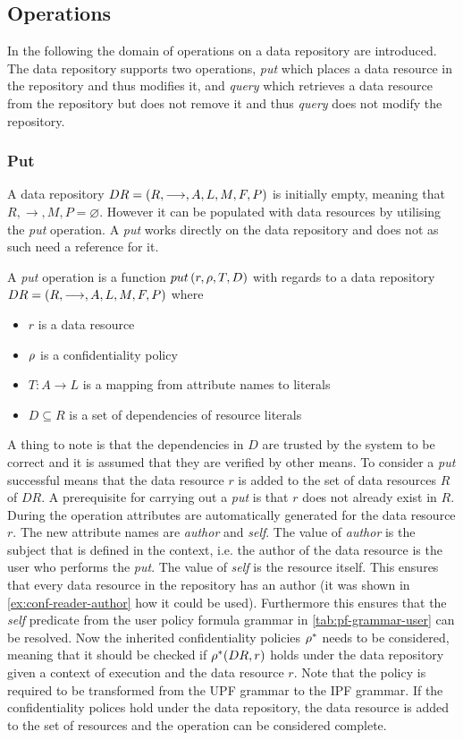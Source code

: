 \subsection{Operations}
In the following the domain of operations on a data repository are introduced. The data repository supports two operations, \emph{put} which places a data resource in the repository and thus modifies it, and \emph{query} which retrieves a data resource from the repository but does not remove it and thus \emph{query} does not modify the repository.

\subsubsection{Put}\label{sec:put}
A data repository $DR= \left( R, \longrightarrow, A, L, M, F, P \right)$ is initially empty, meaning that $R, \longrightarrow, M, P = \varnothing$. However it can be populated with data resources by utilising the \emph{put} operation. A \emph{put} works directly on the data repository and does not as such need a reference for it.
\begin{definition}
A \emph{put} operation is a function $put \left( r, \rho, T, D \right)$ with regards to a data repository $DR= \left( R, \longrightarrow, A, L, M, F, P \right)$ where
\begin{itemize}
  \item $r$ is a data resource
  \item $\rho$ is a confidentiality policy
  \item $T : A \rightarrow L$ is a mapping from attribute names to literals
  \item $D \subseteq R$ is a set of dependencies of resource literals
\end{itemize}
\end{definition}
A thing to note is that the dependencies in $D$ are trusted by the system to be correct and it is assumed that they are verified by other means. To consider a \emph{put} successful means that the data resource $r$ is added to the set of data resources $R$ of $DR$. A prerequisite for carrying out a \emph{put} is that $r$ does not already exist in $R$. During the operation attributes are automatically generated for the data resource $r$. The new attribute names are \emph{author} and \emph{self}. The value of \emph{author} is the subject that is defined in the context, i.e. the author of the data resource is the user who performs the \emph{put}. The value of \emph{self} is the resource itself. This ensures that every data resource in the repository has an author (it was shown in \autoref{ex:conf-reader-author} how it could be used). Furthermore this ensures that the \emph{self} predicate from the user policy formula grammar in \autoref{tab:pf-grammar-user} can be resolved. Now the inherited confidentiality policies $\rho^{\ast}$ needs to be considered, meaning that it should be checked if $\rho^{\ast}(DR,r)$ holds under the data repository given a context of execution and the data resource $r$. Note that the policy is required to be transformed from the UPF grammar to the IPF grammar. If the confidentiality polices hold under the data repository, the data resource is added to the set of resources and the operation can be considered complete.
